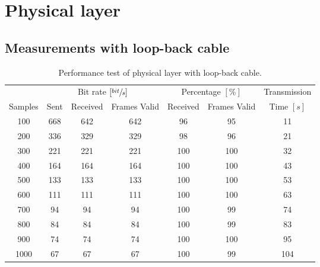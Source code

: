 \section{Physical layer}\label{app:exp:physical_result}
	
	\subsection{Measurements with loop-back cable}
	\begin{table}[!h]
		\begin{center}
			\begin{tabular}{c|c c c|c c|c}
			& \multicolumn{3}{c|}{Bit rate $[\sfrac{bit}{s}]$} & \multicolumn{2}{c|}{Percentage $[\%]$} & Transmission \\
			Samples & Sent & Received & Frames Valid & Received & Frames Valid & Time $[s]$\\
			\hline
			100 & 668 & 642 & 642 & 96 & 95 & 11 \\
			200 & 336 & 329 & 329 & 98 & 96 & 21 \\
			300 & 221 & 221 & 221 & 100 & 100 & 32 \\
			400 & 164 & 164 & 164 & 100 & 100 & 43 \\
			500 & 133 & 133 & 133 & 100 & 100 & 53 \\
			600 & 111 & 111 & 111 & 100 & 100 & 63 \\
			700 & 94 & 94 & 94 & 100 & 99 & 74 \\
			800 & 84 & 84 & 84 & 100 & 99 & 83 \\
			900 & 74 & 74 & 74 & 100 & 100 & 95 \\
			1000 & 67 & 67 & 67 & 100 & 99 & 104 \\
			\end{tabular}
		\end{center}
		\caption{Performance test of physical layer with loop-back cable.}
		\label{tab:exp_phys_cable}
	\end{table}
	
	\pagebreak
